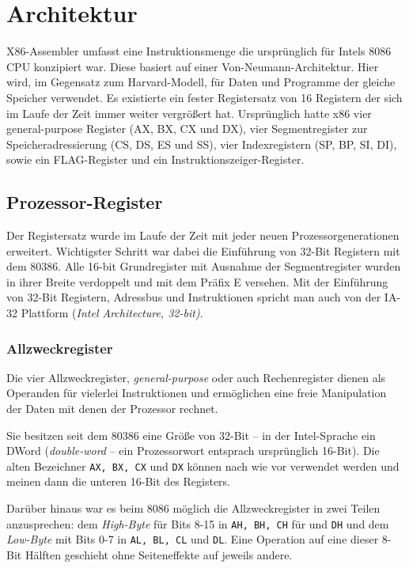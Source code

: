 \section{Architektur}
X86-Assembler umfasst eine Instruktionsmenge die ursprünglich für Intels 8086 CPU konzipiert war. Diese basiert auf einer Von-Neumann-Architektur. Hier wird, im Gegensatz zum Harvard-Modell, für Daten und Programme der gleiche Speicher verwendet. Es existierte ein fester Registersatz von 16 Registern der sich im Laufe der Zeit immer weiter vergrößert hat. Ursprünglich hatte x86 vier general-purpose Register (AX, BX, CX und DX), vier Segmentregister zur Speicheradressierung (CS, DS, ES und SS), vier Indexregistern (SP, BP, SI, DI), sowie ein FLAG-Register und ein Instruktionszeiger-Register.

\subsection{Prozessor-Register}

Der Registersatz wurde im Laufe der Zeit mit jeder neuen Prozessorgenerationen erweitert. Wichtigster Schritt war dabei die Einführung von 32-Bit Registern mit dem 80386. Alle 16-bit Grundregister mit Ausnahme der Segmentregister wurden in ihrer Breite verdoppelt und mit dem Präfix E versehen. Mit der Einführung von 32-Bit Registern, Adressbus und Instruktionen spricht man auch von der IA-32 Plattform (\emph{Intel Architecture, 32-bit)}.

\subsubsection{Allzweckregister}



Die vier Allzweckregister, \emph{general-purpose} oder auch Rechenregister dienen als Operanden für vielerlei Instruktionen und ermöglichen eine freie Manipulation der Daten mit denen der Prozessor rechnet.

Sie besitzen seit dem 80386 eine Größe von 32-Bit – in der Intel-Sprache ein DWord (\emph{double-word} -- ein Prozessorwort entsprach ursprünglich 16-Bit). Die alten Bezeichner {\tt AX, BX, CX} und {\tt DX} können nach wie vor verwendet werden und meinen dann die unteren 16-Bit des Registers.

Darüber hinaus war es beim 8086 möglich die Allzweckregister in zwei Teilen anzusprechen: dem \emph{High-Byte} für Bits 8-15 in {\tt AH, BH, CH} für  und {\tt DH} und dem \emph{Low-Byte} mit Bits 0-7 in {\tt AL, BL, CL} und {\tt DL}. Eine Operation auf eine dieser 8-Bit Hälften geschieht ohne Seiteneffekte auf jeweils andere.

